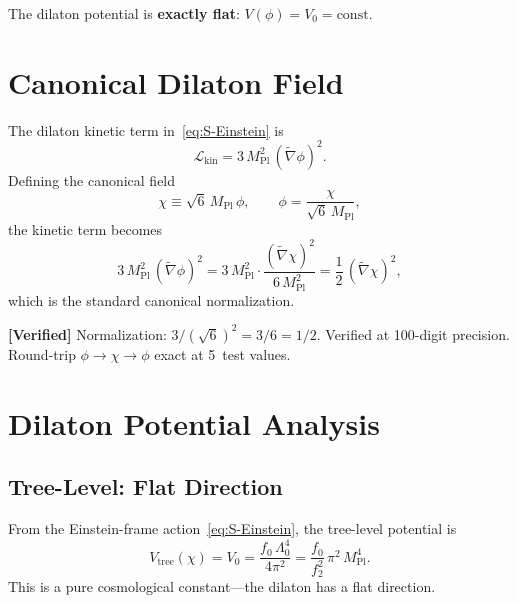 \documentclass[11pt,a4paper]{article}
\theoremstyle{plain}
\theoremstyle{definition}
\newcommand{\verified}[1]{%
  \par\smallskip\noindent
  \colorbox{green!10}{\parbox{\dimexpr\linewidth-2\fboxsep}{%
    \textcolor{green!50!black}{\textbf{[Verified]}} #1}}%
  \par\smallskip}
\begin{document}
The dilaton potential is \textbf{exactly flat}: $V(\phi) = V_0 = \mathrm{const}$.

\section{Canonical Dilaton Field}\label{sec:canonical}

The dilaton kinetic term in~\eqref{eq:S-Einstein} is
\begin{equation}
  \mathcal{L}_{\mathrm{kin}}
  = 3\,M_{\mathrm{Pl}}^2\,(\tilde{\nabla}\phi)^2.
\end{equation}
Defining the canonical field
\begin{equation}\label{eq:chi-def}
  \chi \equiv \sqrt{6}\,M_{\mathrm{Pl}}\,\phi,
  \qquad
  \phi = \frac{\chi}{\sqrt{6}\,M_{\mathrm{Pl}}},
\end{equation}
the kinetic term becomes
\begin{equation}
  3\,M_{\mathrm{Pl}}^2\,(\tilde{\nabla}\phi)^2
  = 3\,M_{\mathrm{Pl}}^2\cdot
  \frac{(\tilde{\nabla}\chi)^2}{6\,M_{\mathrm{Pl}}^2}
  = \frac{1}{2}\,(\tilde{\nabla}\chi)^2,
\end{equation}
which is the standard canonical normalization.

\verified{Normalization: $3 / (\sqrt{6})^2 = 3/6 = 1/2$.  Verified
at 100-digit precision.  Round-trip $\phi \to \chi \to \phi$ exact
at 5~test values.}

\section{Dilaton Potential Analysis}\label{sec:potential}

\subsection{Tree-Level: Flat Direction}

From the Einstein-frame action~\eqref{eq:S-Einstein}, the tree-level
potential is
\begin{equation}\label{eq:V-tree}
  V_{\mathrm{tree}}(\chi) = V_0
  = \frac{f_0\,\Lambda_0^4}{4\pi^2}
  = \frac{f_0}{f_2^2}\,\pi^2\,M_{\mathrm{Pl}}^4.
\end{equation}
This is a pure cosmological constant---the dilaton has a flat direction.
\end{document}
